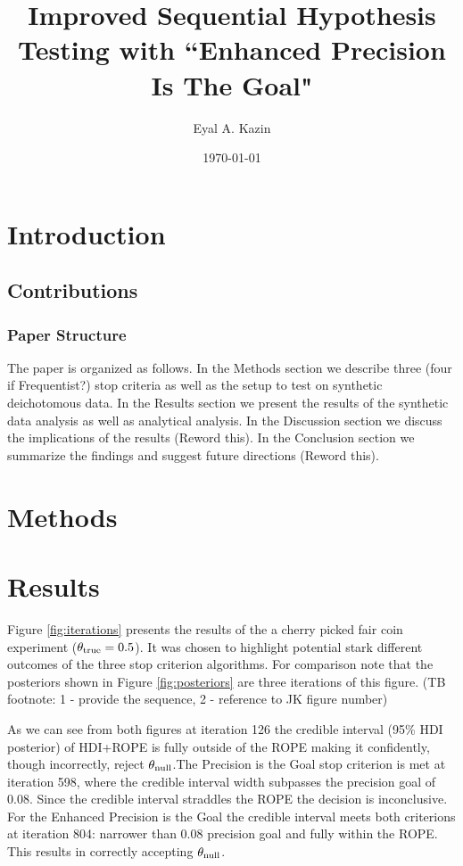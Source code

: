 \documentclass{article}
\title{Improved Sequential Hypothesis Testing with
``Enhanced Precision Is The Goal"}
\date{\today}
\author{Eyal A. Kazin}
\begin{document}
\maketitle



\section{Introduction}


\subsection{Contributions}

\subsubsection{Paper Structure}
The paper is organized as follows.
In the Methods section we describe three (four if Frequentist?)
stop criteria as well as the setup to test on synthetic deichotomous data.
In the Results section we present the results of the synthetic data analysis as well as analytical analysis.
In the Discussion section we discuss the implications of the results (Reword this).
In the Conclusion section we summarize the findings and suggest future directions (Reword this).


\section{Methods}




\section{Results}

Figure \ref{fig:iterations} presents the results of the a cherry picked fair coin
experiment ($\theta_{\rm true}=0.5$). It was chosen to highlight potential stark
different outcomes of the three stop criterion algorithms. For comparison note that the posteriors
shown in Figure \ref{fig:posteriors} are three iterations of this figure.
(TB footnote: 1 - provide the sequence, 2 - reference to JK figure number)

As we can see from both figures at iteration 126 the credible interval (95\% HDI posterior) of HDI+ROPE is fully
outside of the ROPE making it confidently, though incorrectly, reject $\theta_{\rm null}$.The Precision is the Goal stop criterion is met at iteration 598, where the credible
interval width
subpasses the precision goal of 0.08. Since the credible interval straddles the ROPE
the decision is inconclusive.
For the Enhanced Precision is the Goal the credible interval
meets both criterions at iteration 804: narrower than 0.08 precision goal and fully within the ROPE.
This results in correctly accepting $\theta_{\rm null}$.
\end{document}
